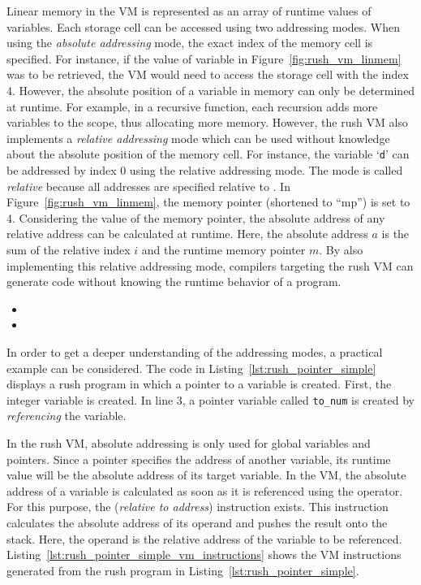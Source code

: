 Linear memory in the VM is represented as an array of runtime values of variables.
Each storage cell can be accessed using two addressing modes.
When using the \emph{absolute addressing} mode, the exact index of the memory cell is specified.
For instance, if the value of variable  in Figure~\ref{fig:rush_vm_linmem} was to be retrieved, the VM would need to access the storage cell with the index 4.
However, the absolute position of a variable in memory can only be determined at runtime.
For example, in a recursive function, each recursion adds more variables to the scope, thus allocating more memory.
However, the rush VM also implements a \emph{relative addressing} mode which can be used without knowledge about the absolute position of the memory cell.
For instance, the variable `\texttt{d}' can be addressed by index 0 using the relative addressing mode.
The mode is called \emph{relative} because all addresses are specified relative to .
In Figure~\ref{fig:rush_vm_linmem}, the memory pointer (shortened to \enquote{mp}) is set to 4.
Considering the value of the memory pointer, the absolute address of any relative address can be calculated at runtime.
Here, the absolute address $a$ is the sum of the relative index $i$ and the runtime memory pointer $m$.
By also implementing this relative addressing mode,
compilers targeting the rush VM can generate code without knowing the runtime behavior of a program.

\begin{itemize}
	\item {}
	\item {}
\end{itemize}

In order to get a deeper understanding of the addressing modes, a practical example can be considered.
The code in Listing~\ref{lst:rush_pointer_simple} displays a rush program in which a pointer to a variable is created.
First, the integer variable  is created.
In line 3, a pointer variable called \texttt{to\_num} is created by \emph{referencing} the  variable.


In the rush VM, absolute addressing is only used for global variables and pointers.
Since a pointer specifies the address of another variable, its runtime value will be the absolute address of its target variable.
In the VM, the absolute address of a variable is calculated as soon as it is referenced using the \qVerb{&} operator.
For this purpose, the  (\emph{relative to address}) instruction exists.
This instruction calculates the absolute address of its operand and pushes the result onto the stack.
Here, the operand is the relative address of the variable to be referenced.
Listing~\ref{lst:rush_pointer_simple_vm_instructions} shows the VM instructions generated from the rush program in Listing~\ref{lst:rush_pointer_simple}.

